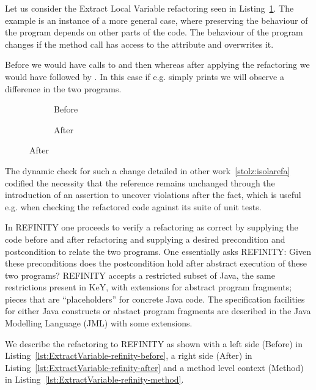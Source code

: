 Let us consider the Extract Local Variable refactoring seen in Listing~\ref{lst:ExtractVariable-java}.
The example is an instance of a more general case, where preserving the behaviour of the program depends on other parts of the code.
The behaviour of the program changes if the method call  has access to the attribute  and overwrites it.

Before we would have calls to  and then  whereas after applying the refactoring we would
have  followed by . In this case if e.g.  simply prints  we will
observe a difference in the two programs.

\begin{figure}[!h]
  \centering
  \begin{subfigure}{.2\linewidth}
    
    \caption{Before}
  \end{subfigure}\hspace{1cm}
  \begin{subfigure}{.3\linewidth}
    
    \caption{After}
  \end{subfigure}
\label{lst:ExtractVariable-java}
\end{figure}

The dynamic check for such a change detailed in other work~\ref{stolz:isolarefa} codified the necessity that the reference 
remains unchanged through the introduction of an assertion  to uncover violations after the fact,
which is useful e.g. when checking the refactored code against its suite of unit tests.

In REFINITY one proceeds to verify a refactoring as correct by supplying the code before and after refactoring and supplying a desired precondition and postcondition to relate
the two programs. One essentially asks REFINITY: Given these preconditions does the postcondition hold after abstract execution of these two programs? REFINITY accepts a restricted
subset of Java, the same restrictions present in KeY, with extensions for abstract program fragments; pieces that are ``placeholders'' for concrete Java code.
The specification facilities for either Java constructs or abstact program fragments are described in the Java Modelling Language (JML) with some extensions.

We describe the refactoring to REFINITY as shown with a left side (Before) in Listing~\ref{lst:ExtractVariable-refinity-before},
a right side (After) in Listing~\ref{lst:ExtractVariable-refinity-after} and a method level context (Method) in Listing~\ref{lst:ExtractVariable-refinity-method}.

